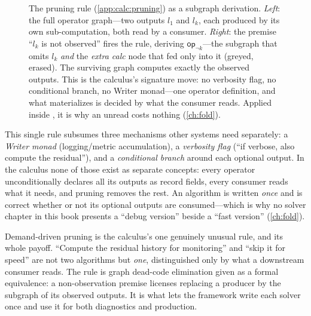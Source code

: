 \begin{figure}[t]
\caption[Demand-driven pruning as graph dead-code elimination]{The pruning rule
(\cref{app:calc:pruning}) as a subgraph derivation. \emph{Left}: the full
operator graph---two outputs $l_1$ and $l_k$, each produced by its own
sub-computation, both read by a consumer. \emph{Right}: the premise ``$l_k$ is
not observed'' fires the rule, deriving $\textsf{op}_{\neg k}$---the subgraph that
omits $l_k$ \emph{and} the \emph{extra calc} node that fed only into it (greyed,
erased). The surviving graph computes exactly the observed outputs. This is the
calculus's signature move: no verbosity flag, no conditional branch, no Writer
monad---one operator definition, and what materializes is decided by what the
consumer reads. Applied inside , it is why an unread
 costs nothing (\cref{ch:fold}).}
\label{fig:appA:pruning}
\end{figure}

This single rule subsumes three mechanisms other systems need separately: a
\emph{Writer monad} (logging/metric accumulation), a \emph{verbosity flag}
(``if verbose, also compute the residual''), and a \emph{conditional branch}
around each optional output. In the calculus none of those exist as separate
concepts: every operator unconditionally declares all its outputs as record
fields, every consumer reads what it needs, and pruning removes the rest. An
algorithm is written \emph{once} and is correct whether or not its optional
outputs are consumed---which is why no solver chapter in this book presents a
``debug version'' beside a ``fast version'' (\cref{ch:fold}).

\begin{keyidea}
Demand-driven pruning is the calculus's one genuinely unusual rule, and its whole
payoff. ``Compute the residual history for monitoring'' and ``skip it for speed''
are not two algorithms but \emph{one}, distinguished only by what a downstream
consumer reads. The rule is graph dead-code elimination given as a formal
equivalence: a non-observation premise licenses replacing a producer by the
subgraph of its observed outputs. It is what lets the framework write each solver
once and use it for both diagnostics and production.
\end{keyidea}

